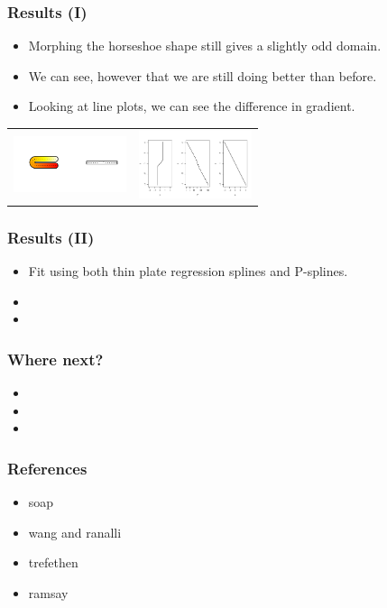 \documentclass[ignorenonframetext]{beamer} %
\newcommand{\bc}{\begin{center}}
\newcommand{\ec}{\end{center}}
\newcommand{\bi}{\begin{itemize}}
\newcommand{\ei}{\end{itemize}}
\begin{document}
\begin{frame}
	\frametitle{Results (I)}
       \bi
         \item Morphing the horseshoe shape still gives a slightly odd domain. 
         \item We can see, however that we are still doing better than before.
         \item Looking at line plots, we can see the difference in gradient.

       \ei
       \bc\begin{tabular}{@{}cc}
          \includegraphics[width=1.3in]{figs/horseshoecentreline} & \includegraphics[width=1.3in]{figs/centrelinelineplots}\\
       \end{tabular}\ec


\end{frame}

\begin{frame}
	\frametitle{Results (II)}
       \bi
         \item Fit using both thin plate regression splines and P-splines. 
         \item
         \item 
        \ei
\end{frame}
\begin{frame}
	\frametitle{Where next?}
       \bi
         \item 
         \item
         \item 
        \ei
\end{frame}


\begin{frame}
	\frametitle{References}
       \bi
         \item soap
         \item wang and ranalli
         \item trefethen
         \item ramsay
        \ei
\end{frame}
\end{document}
